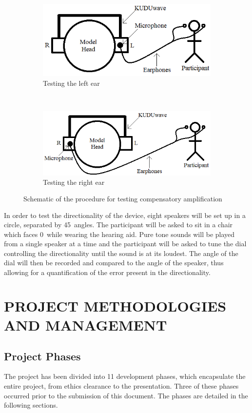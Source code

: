 \documentclass[10pt,twocolumn]{witseiepaper}
\begin{document}
\begin{figure}[h]
	\centering
	\begin{subfigure}[t]{0.5\textwidth}
		\centering
		\includegraphics[width=0.8\columnwidth]{gainTestingLeft.png}
		\caption{Testing the left ear}
	\end{subfigure}%
	\\
	\begin{subfigure}[t]{0.5\textwidth}
		\centering
		\includegraphics[width=0.8\columnwidth]{gainTestingRight.png}
		\caption{Testing the right ear}
	\end{subfigure}
	\caption{Schematic of the procedure for testing compensatory amplification}
	\label{fig:testing}	
\end{figure}

In order to test the directionality of the device, eight speakers will be set up in a circle, separated by 45\textdegree\ angles. The participant will be asked to sit in a chair which faces 0\textdegree\  while wearing the hearing aid. Pure tone sounds will be played from a single speaker at a time and the participant will be asked to tune the dial controlling the directionality until the sound is at its loudest. The angle of the dial will then be recorded and compared to the angle of the speaker, thus allowing for a quantification of the error present in the directionality. 

\section{PROJECT METHODOLOGIES AND MANAGEMENT}
\subsection{Project Phases}
The project has been divided into 11 development phases, which encapsulate the entire project, from ethics clearance to the presentation. Three of these phases occurred prior to the submission of this document. The phases are detailed in the following sections.
\end{document}

